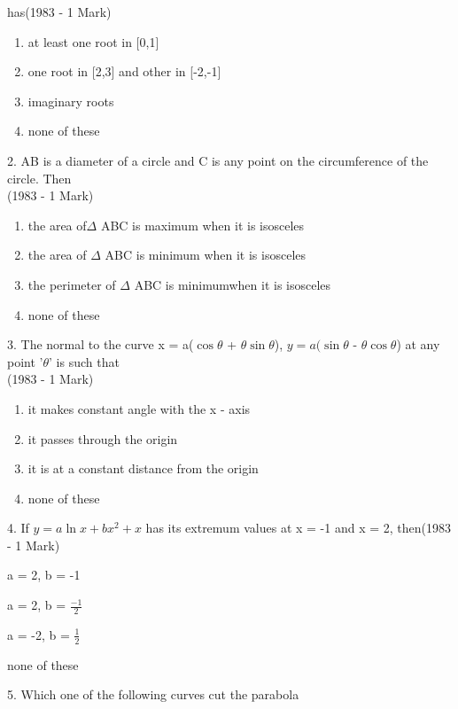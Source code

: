 \documentclass[journal,12pt,twocolumn]{IEEEtran}
\theoremstyle{remark}
\begin{document}
has\hfill(1983 - 1 Mark)
\begin{enumerate}[label=\alph*.]
	\item at least one root in [0,1]
	\item one root in [2,3] and other in [-2,-1]
        \item imaginary roots
	\item none of these\\
\end{enumerate}
2.  AB is a diameter of a circle and C is any point \indent on the
circumference of the circle. Then\\ \indent\hfill
(1983 - 1 Mark)
\begin{enumerate}[label=\alph*.]
	\item the area of$\Delta$ ABC is maximum when it is isosceles
	\item the area of $\Delta$ ABC is minimum when it is isosceles
	\item the perimeter of $\Delta$ ABC is minimumwhen it is isosceles
	\item none of these\\
\end{enumerate}
3.  The normal to the curve x = a($\cos \theta$ + $\theta\sin \theta$),
\indent $y = a(\sin \theta$ - $\theta\cos \theta$) at any point '$\theta$' 
is such that\\[2pt]\indent\hfill(1983 - 1 Mark)
\begin{enumerate}[label=\alph*.]
	\item it makes  constant angle with the x - axis
	\item it passes through the origin
	\item it is at a constant distance from the origin
	\item none of these\\
\end{enumerate}
4.  If $y=a\ln x + bx^2 +x$ has its extremum values at \indent x = -1
and x = 2, then\hfill(1983 - 1 Mark)
\begin{enumerate}[label=\alph*.]
\begin{multicols}{2}
	\item a = 2, b = -1
	\item a = 2, b = $\displaystyle\frac{-1}{2}$
	\item a = -2, b = $\displaystyle\frac{1}{2}$
	\item none of these
\end{multicols}
\end{enumerate}
5. Which one of the following curves cut the \indent  parabola
\end{document}
